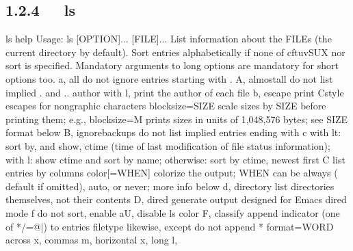 \documentclass[letterpaper,12pt,english]{sphinxmanual}
\begin{document}
\subsection{1.2.4   ls}
\label{\detokenize{001software/001install/linux:ls}}
\begin{sphinxVerbatim}[commandchars=\\\{\}]
\PYGZdl{} ls \PYGZhy{}\PYGZhy{}help
Usage: ls [OPTION]... [FILE]...
List information about the FILEs (the current directory by default).
Sort entries alphabetically if none of \PYGZhy{}cftuvSUX nor \PYGZhy{}\PYGZhy{}sort is specified.
Mandatory arguments to long options are mandatory for short options too.
  \PYGZhy{}a, \PYGZhy{}\PYGZhy{}all                  do not ignore entries starting with .
  \PYGZhy{}A, \PYGZhy{}\PYGZhy{}almost\PYGZhy{}all           do not list implied . and ..
      \PYGZhy{}\PYGZhy{}author               with \PYGZhy{}l, print the author of each file
  \PYGZhy{}b, \PYGZhy{}\PYGZhy{}escape               print C\PYGZhy{}style escapes for nongraphic   characters
      \PYGZhy{}\PYGZhy{}block\PYGZhy{}size=SIZE      scale sizes by SIZE before printing them;   e.g.,
                               \PYGZsq{}\PYGZhy{}\PYGZhy{}block\PYGZhy{}size=M\PYGZsq{} prints sizes in units of
                               1,048,576 bytes; see SIZE format below
  \PYGZhy{}B, \PYGZhy{}\PYGZhy{}ignore\PYGZhy{}backups       do not list implied entries ending with \PYGZti{}
  \PYGZhy{}c                         with \PYGZhy{}lt: sort by, and show, ctime (time of   last
                               modification of file status information);
                               with \PYGZhy{}l: show ctime and sort by name;
                               otherwise: sort by ctime, newest first
  \PYGZhy{}C                         list entries by columns
      \PYGZhy{}\PYGZhy{}color[=WHEN]         colorize the output; WHEN can be \PYGZsq{}always\PYGZsq{} (  default
                               if omitted), \PYGZsq{}auto\PYGZsq{}, or \PYGZsq{}never\PYGZsq{}; more info   below
  \PYGZhy{}d, \PYGZhy{}\PYGZhy{}directory            list directories themselves, not their   contents
  \PYGZhy{}D, \PYGZhy{}\PYGZhy{}dired                generate output designed for Emacs\PYGZsq{} dired   mode
  \PYGZhy{}f                         do not sort, enable \PYGZhy{}aU, disable \PYGZhy{}ls \PYGZhy{}\PYGZhy{}color
  \PYGZhy{}F, \PYGZhy{}\PYGZhy{}classify             append indicator (one of */=\PYGZgt{}@|) to entries
      \PYGZhy{}\PYGZhy{}file\PYGZhy{}type            likewise, except do not append \PYGZsq{}*\PYGZsq{}
      \PYGZhy{}\PYGZhy{}format=WORD          across \PYGZhy{}x, commas \PYGZhy{}m, horizontal \PYGZhy{}x, long \PYGZhy{}l,

\end{sphinxVerbatim}
\end{document}
